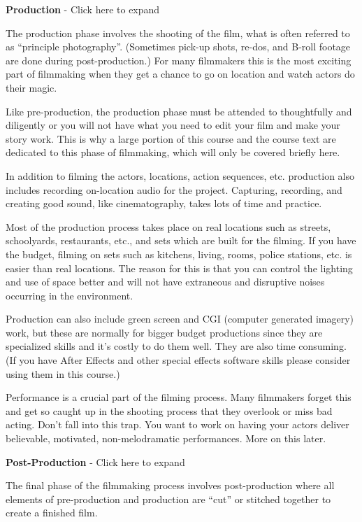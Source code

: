 \documentclass[
]{book}
\begin{document}
\textbf{Production} - Click here to expand

The production phase involves the shooting of the film, what is often referred to as ``principle photography''. (Sometimes pick-up shots, re-dos, and B-roll footage are done during post-production.) For many filmmakers this is the most exciting part of filmmaking when they get a chance to go on location and watch actors do their magic.

Like pre-production, the production phase must be attended to thoughtfully and diligently or you will not have what you need to edit your film and make your story work. This is why a large portion of this course and the course text are dedicated to this phase of filmmaking, which will only be covered briefly here.

In addition to filming the actors, locations, action sequences, etc. production also includes recording on-location audio for the project. Capturing, recording, and creating good sound, like cinematography, takes lots of time and practice.

Most of the production process takes place on real locations such as streets, schoolyards, restaurants, etc., and sets which are built for the filming. If you have the budget, filming on sets such as kitchens, living, rooms, police stations, etc. is easier than real locations. The reason for this is that you can control the lighting and use of space better and will not have extraneous and disruptive noises occurring in the environment.

Production can also include green screen and CGI (computer generated imagery) work, but these are normally for bigger budget productions since they are specialized skills and it's costly to do them well. They are also time consuming. (If you have After Effects and other special effects software skills please consider using them in this course.)

Performance is a crucial part of the filming process. Many filmmakers forget this and get so caught up in the shooting process that they overlook or miss bad acting. Don't fall into this trap. You want to work on having your actors deliver believable, motivated, non-melodramatic performances. More on this later.

\textbf{Post-Production} - Click here to expand

The final phase of the filmmaking process involves post-production where all elements of pre-production and production are ``cut'' or stitched together to create a finished film.
\end{document}
